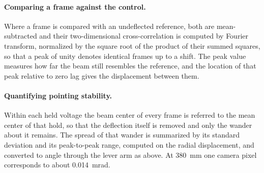 \documentclass{article}
\begin{document}
\paragraph{Comparing a frame against the control.}
Where a frame is compared with an undeflected reference, both are mean-subtracted and their
two-dimensional cross-correlation is computed by Fourier transform, normalized by the square root
of the product of their summed squares, so that a peak of unity denotes identical frames up to a
shift. The peak value measures how far the beam still resembles the reference, and the location
of that peak relative to zero lag gives the displacement between them.

\paragraph{Quantifying pointing stability.}
Within each held voltage the beam center of every frame is referred to the mean center of that
hold, so that the deflection itself is removed and only the wander about it remains. The spread
of that wander is summarized by its standard deviation and its peak-to-peak range, computed on
the radial displacement, and converted to angle through the lever arm as above. At 380~mm one
camera pixel corresponds to about 0.014~mrad.
\end{document}
